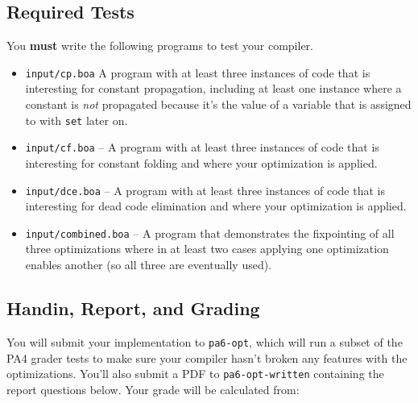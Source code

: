 \documentclass[10pt, oneside]{article}
\begin{document}
\subsection*{Required Tests}

You {\bf must} write the following programs to test your compiler.

\begin{itemize}

\item {\tt input/cp.boa} A program with at least three instances of code that
is interesting for constant propagation, including at least one instance
where a constant is {\it not} propagated because it's the value of a variable
that is assigned to with {\tt set} later on.

\item {\tt input/cf.boa} -- A program with at least three instances of code
that is interesting for constant folding and where your optimization is
applied.

\item {\tt input/dce.boa} -- A program with at least three instances of code
that is interesting for dead code elimination and where your optimization is
applied.

\item {\tt input/combined.boa} -- A program that demonstrates the fixpointing
of all three optimizations where in at least two cases applying one
optimization enables another (so all three are eventually used).

\end{itemize}

\subsection*{Handin, Report, and Grading}

You will submit your implementation to {\tt pa6-opt}, which will run a subset
of the PA4 grader tests to make sure your compiler hasn't broken any features
with the optimizations. You'll also submit a PDF to {\tt pa6-opt-written}
containing the report questions below. Your grade will be calculated from:
\end{document}
